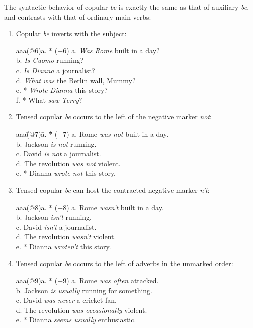The syntactic behavior of copular {\em be} is exactly the same as that of
auxiliary {\em be\/}, and contrasts with that of ordinary main verbs:
\begin{enumerate}
 
\item Copular {\em be} inverts with the subject:
\begin{tabbing}
aaa\=(@6)\= a. \= *\= \kill
   \>(+6)\> a. \>  \> {\em Was Rome} built in a day? \\ 
   \>    \>  b. \>  \> {\em Is Cuomo} running? \\
   \>    \>  c. \>  \> {\em Is Dianna} a journalist? \\
   \>    \>  d. \>  \> {\em What was} the Berlin wall, Mummy? \\
   \>    \>  e. \> *\> {\em Wrote Dianna} this story? \\
   \>    \>  f. \> *\> What {\em saw Terry\/}?
\end{tabbing}

\item Tensed copular {\em be} occurs to the left of the negative marker 
      {\em not\/}:
\begin{tabbing}
aaa\=(@7)\= a. \= *\= \kill
   \>(+7)\> a. \>  \> Rome {\em was not} built in a day. \\ 
   \>    \>  b. \>  \> Jackson {\em is not} running. \\
   \>    \>  c. \>  \> David {\em is not} a journalist. \\
   \>    \>  d. \>  \> The revolution {\em was not} violent. \\
   \>    \>  e. \> *\> Dianna {\em wrote not} this story.
\end{tabbing}

\item Tensed copular {\em be} can host the contracted negative marker
{\em n't\/}:
\begin{tabbing}
aaa\=(@8)\= a. \= *\= \kill
   \>(+8)\> a. \>  \> Rome {\em wasn't} built in a day. \\ 
   \>    \>  b. \>  \> Jackson {\em isn't} running. \\
   \>    \>  c. \>  \> David {\em isn't} a journalist. \\
   \>    \>  d. \>  \> The revolution {\em wasn't} violent. \\
   \>    \>  e. \> *\> Dianna {\em wroten't} this story.
\end{tabbing}

\item Tensed copular {\em be} occurs to the left of adverbs in the
unmarked order:
\begin{tabbing}
aaa\=(@9)\= a. \= *\= \kill
   \>(+9)\> a. \>  \> Rome {\em was often} attacked. \\
   \>    \>  b. \>  \> Jackson {\em is usually} running for something. \\
   \>    \>  c. \>  \> David {\em was never} a cricket fan. \\
   \>    \>  d. \>  \> The revolution {\em was occasionally} violent. \\
   \>    \>  e. \> *\> Dianna {\em seems usually} enthusiastic.
\end{tabbing}


\end{enumerate}
